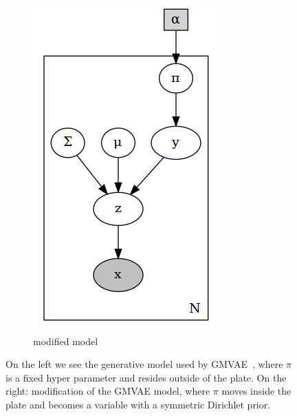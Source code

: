 \documentclass[11pt, a4paper]{report}
\theoremstyle{plain}
\theoremstyle{definition}
\theoremstyle{remark}
\begin{document}
\begin{figure}[h]
\begin{subfigure}[b]{0.4\textwidth}
\includegraphics[width=\textwidth]{plots/mmpp.gv.png}
\caption{modified model}
\label{fig:mymix}
\end{subfigure}
\caption{
On the left we see the generative model used by
GMVAE~\cite{dilokthanakul2016deep}, where $\pi$ is a fixed hyper parameter and resides
outside of the plate.
On the right: modification of the GMVAE model, where $\pi$ moves inside the plate
and becomes a variable with a symmetric Dirichlet prior.}
\label{fig:mixturemodels2}
\end{figure}
\end{document}
